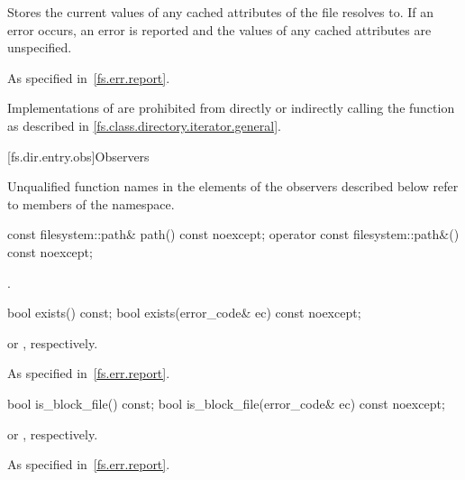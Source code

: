\begin{itemdescr}
\pnum
\effects
Stores the current values of any cached attributes of the file  resolves to.
If an error occurs, an error is reported
and the values of any cached attributes are unspecified.

\pnum
\throws
As specified in~\ref{fs.err.report}.

\pnum
\begin{note}
Implementations of 
are prohibited from directly or indirectly calling the  function
as described in \ref{fs.class.directory.iterator.general}.
\end{note}
\end{itemdescr}

[fs.dir.entry.obs]{Observers}

\pnum
Unqualified function names in the \returns elements of the
 observers described below refer to members of the
 namespace.

%
%
\begin{itemdecl}
const filesystem::path& path() const noexcept;
operator const filesystem::path&() const noexcept;
\end{itemdecl}

\begin{itemdescr}
\pnum
\returns
{}.
\end{itemdescr}

%
\begin{itemdecl}
bool exists() const;
bool exists(error_code& ec) const noexcept;
\end{itemdecl}

\begin{itemdescr}
\pnum
\returns
{} or , respectively.

\pnum
\throws
As specified in~\ref{fs.err.report}.
\end{itemdescr}

%
\begin{itemdecl}
bool is_block_file() const;
bool is_block_file(error_code& ec) const noexcept;
\end{itemdecl}

\begin{itemdescr}
\pnum
\returns
{} or , respectively.

\pnum
\throws
As specified in~\ref{fs.err.report}.
\end{itemdescr}

